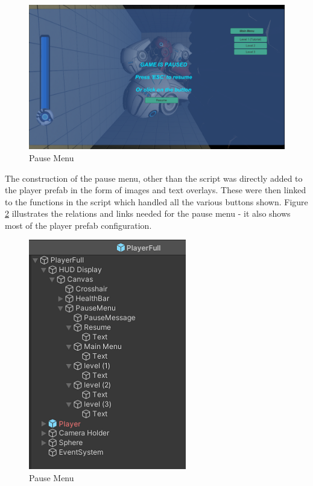 \begin{figure}[H]
\centering
\includegraphics[scale=0.3]{Figures/pause.png}
\caption{Pause Menu}
\label{pause}
\end{figure}

\noindent The construction of the pause menu, other than the script was directly added to the player prefab in the form of images and text overlays. These were then linked to the functions in the script which handled all the various buttons shown. Figure \ref{pause2} illustrates the relations and links needed for the pause menu - it also shows most of the player prefab configuration.

\begin{figure}[H]
\centering
\includegraphics[scale=1]{Figures/pause2.png}
\caption{Pause Menu}
\label{pause2}
\end{figure}

